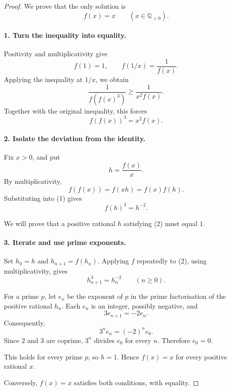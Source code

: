 
\begin{dlsummary}[title={\bfseries Solution 41. The Prime-Exponent Trap},breakable]

\begin{proof}
We prove that the only solution is
\[
\boxed{f(x)=x\qquad(x\in\mathbb Q_{>0}).}
\]

\paragraph{1. Turn the inequality into equality.}

Positivity and multiplicativity give
\[
f(1)=1,\qquad f(1/x)=\frac1{f(x)}.
\]
Applying the inequality at \(1/x\), we obtain
\[
\frac1{f(f(x)^3)}\ge\frac1{x^2f(x)}.
\]
Together with the original inequality, this forces
\[
f(f(x))^3=x^2f(x). \tag{1}
\]

\paragraph{2. Isolate the deviation from the identity.}

Fix \(x>0\), and put
\[
h=\frac{f(x)}x.
\]
By multiplicativity,
\[
f(f(x))=f(xh)=f(x)f(h).
\]
Substituting into (1) gives
\[
f(h)^3=h^{-2}. \tag{2}
\]

We will prove that a positive rational \(h\) satisfying (2) must equal \(1\).

\paragraph{3. Iterate and use prime exponents.}

Set \(h_0=h\) and \(h_{n+1}=f(h_n)\). Applying \(f\) repeatedly to (2), using multiplicativity, gives
\[
h_{n+1}^3=h_n^{-2}\qquad(n\ge0).
\]

For a prime \(p\), let \(e_n\) be the exponent of \(p\) in the prime factorisation of the positive rational \(h_n\). Each \(e_n\) is an integer, possibly negative, and
\[
3e_{n+1}=-2e_n.
\]
Consequently,
\[
3^n e_n=(-2)^n e_0.
\]
Since \(2\) and \(3\) are coprime, \(3^n\) divides \(e_0\) for every \(n\). Therefore \(e_0=0\).

This holds for every prime \(p\), so \(h=1\). Hence \(f(x)=x\) for every positive rational \(x\).

Conversely, \(f(x)=x\) satisfies both conditions, with equality.
\end{proof}
\end{dlsummary}

